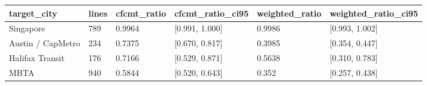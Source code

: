\begin{tabular}{llllll}
\toprule
target\_city & lines & cfcmt\_ratio & cfcmt\_ratio\_ci95 & weighted\_ratio & weighted\_ratio\_ci95 \\
\midrule
Singapore & 789 & 0.9964 & [0.991, 1.000] & 0.9986 & [0.993, 1.002] \\
Austin / CapMetro & 234 & 0.7375 & [0.670, 0.817] & 0.3985 & [0.354, 0.447] \\
Halifax Transit & 176 & 0.7166 & [0.529, 0.871] & 0.5638 & [0.310, 0.783] \\
MBTA & 940 & 0.5844 & [0.520, 0.643] & 0.352 & [0.257, 0.438] \\
\bottomrule
\end{tabular}
